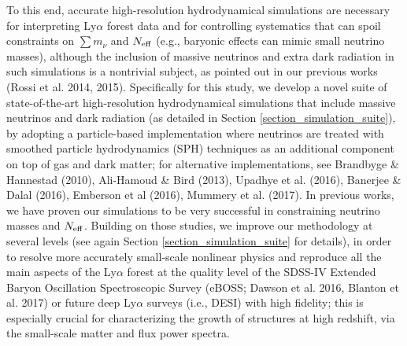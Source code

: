 \documentclass{emulateapj}
\begin{document}

To this end, accurate high-resolution hydrodynamical simulations are necessary for interpreting Ly$\alpha$ forest data and for
controlling systematics that can spoil constraints on $\sum m_{\nu}$ and $N_{\rm eff}$ (e.g., baryonic effects can mimic small neutrino masses), although the 
inclusion of massive neutrinos and extra dark radiation 
in such simulations is a nontrivial subject, as pointed out in our previous works (Rossi et al. 2014, 2015).
Specifically for this study, we develop a novel suite of state-of-the-art high-resolution hydrodynamical simulations
that include massive neutrinos and dark radiation (as detailed in Section \ref{section_simulation_suite}), by adopting 
a particle-based implementation where neutrinos are treated with smoothed particle hydrodynamics (SPH) techniques as an additional component on top of gas and dark matter;
for alternative implementations, see Brandbyge \& Hannestad (2010),
Ali-Hamoud \& Bird (2013), Upadhye et al. (2016),  Banerjee \& Dalal (2016),  Emberson et al (2016), Mummery et al. (2017).
In previous works, we have proven our simulations to be very successful in constraining neutrino masses and $N_{\rm eff}$.
Building on those studies, we improve our methodology at several levels (see again Section \ref{section_simulation_suite} for details), in order  
to  resolve more accurately small-scale nonlinear physics
and reproduce
all the main aspects of the Ly$\alpha$ forest at the quality level of the SDSS-IV Extended Baryon Oscillation Spectroscopic Survey (eBOSS; Dawson et al. 2016, Blanton et al. 2017)
or future deep Ly$\alpha$ surveys (i.e., DESI) with high fidelity; 
this is especially crucial for characterizing the growth of structures at high redshift, via the small-scale matter and flux power spectra. 
   
 
\end{document}
